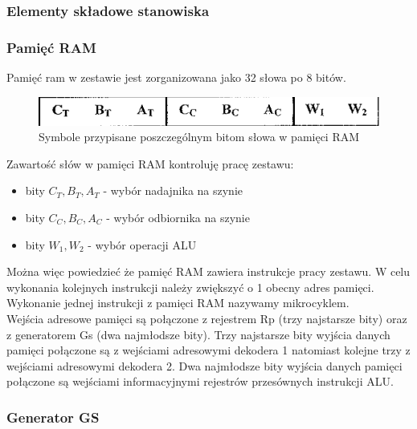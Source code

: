 \documentclass[../main.tex]{subfiles}
\begin{document}
    \subsubsection{Elementy składowe stanowiska}

        \subsubsection*{Pamięć RAM}

        Pamięć ram w zestawie jest zorganizowana jako 32 słowa po 8 bitów.
        
        \begin{figure}[H]
            \centering
            \includegraphics[width=\linewidth]{ram_symbol.png}
            \caption{Symbole przypisane  poszczególnym bitom słowa w pamięci RAM}
            \label{fig:ram_symbol}
        \end{figure}
        
        Zawartość słów w pamięci RAM kontroluję pracę zestawu:

        \begin{itemize}
            \item bity $C_T, B_T, A_T$ - wybór nadajnika na szynie
            \item bity $C_C, B_C, A_C$ - wybór odbiornika na szynie
            \item bity $W_1, W_2$ - wybór operacji ALU
        \end{itemize}

        Można więc powiedzieć że pamięć RAM zawiera instrukcje pracy zestawu. W celu wykonania kolejnych instrukcji należy zwiększyć o 1
        obecny adres pamięci. Wykonanie jednej instrukcji z pamięci RAM nazywamy mikrocyklem.
        \\
        Wejścia adresowe pamięci są połączone z rejestrem Rp (trzy najstarsze bity) oraz z generatorem Gs (dwa najmłodsze bity). 
        Trzy najstarsze bity wyjścia danych pamięci połączone są z wejściami adresowymi dekodera 1 natomiast kolejne trzy z wejściami 
        adresowymi dekodera 2. Dwa najmłodsze bity wyjścia danych pamięci połączone są wejściami informacyjnymi rejestrów przesównych instrukcji ALU.

        \subsubsection*{Generator GS}
        
\end{document}
